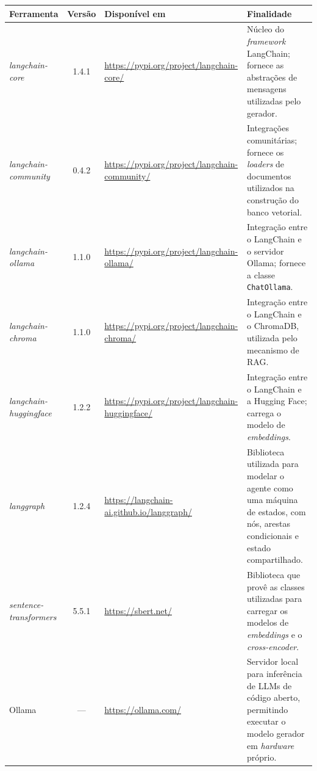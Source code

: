 \begin{tabframed}[!htb]
	\centering
	\caption{\emph{Frameworks}, banco vetorial e ambiente de desenvolvimento.\label{quad:materiais2}}
	\footnotesize
	\begin{tabular}{|p{2.7cm}|c|>{\raggedright\arraybackslash}p{3.5cm}|>{\raggedright\arraybackslash}p{6cm}|}
		\hline
		\textbf{Ferramenta} & \textbf{Versão} & \textbf{Disponível em} & \textbf{Finalidade} \\
		\hline
		
		\emph{langchain-core} & 1.4.1 & \url{https://pypi.org/project/langchain-core/} &
		Núcleo do \emph{framework} LangChain; fornece as abstrações de mensagens utilizadas pelo gerador. \\
		\hline
		
		\emph{langchain-community} & 0.4.2 & \url{https://pypi.org/project/langchain-community/} &
		Integrações comunitárias; fornece os \emph{loaders} de documentos utilizados na construção do banco vetorial. \\
		\hline
		
		\emph{langchain-ollama} & 1.1.0 & \url{https://pypi.org/project/langchain-ollama/} &
		Integração entre o LangChain e o servidor Ollama; fornece a classe \texttt{ChatOllama}. \\
		\hline
		
		\emph{langchain-chroma} & 1.1.0 & \url{https://pypi.org/project/langchain-chroma/} &
		Integração entre o LangChain e o ChromaDB, utilizada pelo mecanismo de RAG. \\
		\hline
		
		\emph{langchain-huggingface} & 1.2.2 & \url{https://pypi.org/project/langchain-huggingface/} &
		Integração entre o LangChain e a Hugging Face; carrega o modelo de \emph{embeddings}. \\
		\hline
		
		\emph{langgraph} & 1.2.4 & \url{https://langchain-ai.github.io/langgraph/} &
		Biblioteca utilizada para modelar o agente como uma máquina de estados, com nós, arestas condicionais e estado compartilhado. \\
		\hline
		
		\emph{sentence-transformers} & 5.5.1 & \url{https://sbert.net/} &
		Biblioteca que provê as classes utilizadas para carregar os modelos de \emph{embeddings} e o \emph{cross-encoder}. \\
		\hline
		
		Ollama & --- & \url{https://ollama.com/} &
		Servidor local para inferência de LLMs de código aberto, permitindo executar o modelo gerador em \emph{hardware} próprio. \\
		\hline
		

\end{tabular}
\end{tabframed}
